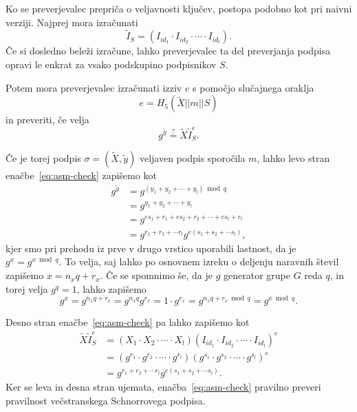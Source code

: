 Ko se preverjevalec prepriča o veljavnosti ključev, postopa podobno kot pri naivni verziji. Najprej
mora izračunati
$$
\tilde{I}_S = (I_{id_1} \cdot I_{id_2} \cdot \cdots \cdot I_{id_l}).
$$
Če si dosledno beleži izračune, lahko preverjevalec ta del preverjanja podpisa opravi le enkrat za
vsako podskupino podpisnikov $S$.

Potem mora preverjevalec izračunati izziv $e$ s pomočjo slučajnega oraklja
$$
e = H_5(\tilde{X} || m || S)
$$
in preveriti, če velja
\begin{equation}
\label{eq:asm-check}
g^{\tilde{y}} \stackrel{?}{=} \tilde{X} \tilde{I}_S^e.
\end{equation}

Če je torej podpis $\sigma = (\tilde{X}, \tilde{y})$ veljaven podpis sporočila $m$, lahko levo stran
enačbe~\eqref{eq:asm-check} zapišemo kot
\begin{align*}
    g^{\tilde{y}} &= g^{(y_1 + y_2 + \cdots + y_l) \bmod q} \\
                  &= g^{y_1 + y_2 + \cdots + y_l} \\
                  &= g^{e s_1 + r_1 + e s_2 + r_2 + \cdots + e s_l + r_l} \\
                  &= g^{r_1 + r_2 + \cdots r_l} g^{e (s_1 + s_2 + \cdots s_l)},
\end{align*}
kjer smo pri prehodu iz prve v drugo vrstico uporabili lastnost, da je $g^x = g^{x \bmod q}$. To velja,
saj lahko po osnovnem izreku o deljenju naravnih števil zapišemo $x = n_x q + r_x$. Če se spomnimo še,
da je $g$ generator grupe $G$ reda $q$, in torej velja $g^q = 1$, lahko zapišemo
$$
g^x = g^{n_x q + r_x} = g^{n_x q} g^{r_x} = 1 \cdot g^{r_x} = g^{n_x q + r_x \bmod q} = g^{x \bmod q}.
$$

Desno stran enačbe~\eqref{eq:asm-check} pa lahko zapišemo kot
\begin{align*}
    \tilde{X} \tilde{I}_S^e &= (X_1 \cdot X_2 \cdot \cdots \cdot X_l)
        (I_{id_1} \cdot I_{id_2} \cdot \cdots \cdot I_{id_l})^e \\
    &=(g^{r_1} \cdot g^{r_2} \cdot \cdots \cdot g^{r_l})
        (g^{s_1} \cdot g^{s_2} \cdot \cdots \cdot g^{s_l})^e \\
    &= g^{r_1 + r_2 + \cdots r_l} g^{e (s_1 + s_2 + \cdots s_l)}.
\end{align*}
Ker se leva in desna stran ujemata, enačba~\eqref{eq:asm-check} pravilno preveri pravilnost večstranskega
Schnorrovega podpisa.

